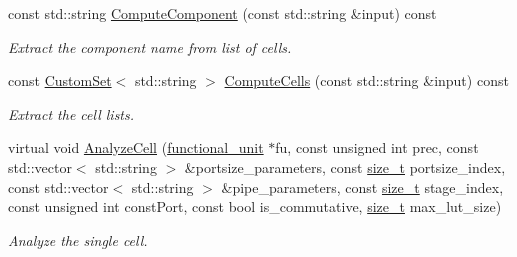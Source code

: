 \begin{DoxyCompactItemize}
\item 
const std\+::string \hyperlink{classRTLCharacterization_ab22c0a668aea8294ea67188cc5e0846d}{Compute\+Component} (const std\+::string \&input) const
\begin{DoxyCompactList}\small\item\em Extract the component name from list of cells. \end{DoxyCompactList}\item 
const \hyperlink{custom__set_8hpp_a615bc2f42fc38a4bb1790d12c759e86f}{Custom\+Set}$<$ std\+::string $>$ \hyperlink{classRTLCharacterization_a9f3427f34b9800e5bd6e3fa7a121908a}{Compute\+Cells} (const std\+::string \&input) const
\begin{DoxyCompactList}\small\item\em Extract the cell lists. \end{DoxyCompactList}\item 
virtual void \hyperlink{classRTLCharacterization_a61ddc1e36acd32ca894f84303206ff47}{Analyze\+Cell} (\hyperlink{structfunctional__unit}{functional\+\_\+unit} $\ast$fu, const unsigned int prec, const std\+::vector$<$ std\+::string $>$ \&portsize\+\_\+parameters, const \hyperlink{tutorial__fpt__2017_2intro_2sixth_2test_8c_a7c94ea6f8948649f8d181ae55911eeaf}{size\+\_\+t} portsize\+\_\+index, const std\+::vector$<$ std\+::string $>$ \&pipe\+\_\+parameters, const \hyperlink{tutorial__fpt__2017_2intro_2sixth_2test_8c_a7c94ea6f8948649f8d181ae55911eeaf}{size\+\_\+t} stage\+\_\+index, const unsigned int const\+Port, const bool is\+\_\+commutative, \hyperlink{tutorial__fpt__2017_2intro_2sixth_2test_8c_a7c94ea6f8948649f8d181ae55911eeaf}{size\+\_\+t} max\+\_\+lut\+\_\+size)
\begin{DoxyCompactList}\small\item\em Analyze the single cell. \end{DoxyCompactList}\end{DoxyCompactItemize}
